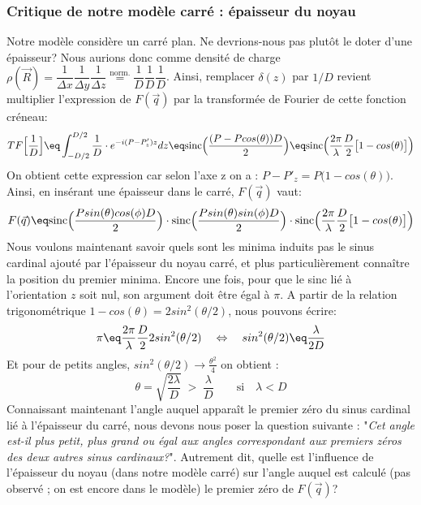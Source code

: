     \subsubsection{Critique de notre modèle carré : épaisseur du noyau}


Notre modèle considère un carré plan. Ne devrions-nous pas plutôt le doter d'une épaisseur? Nous aurions donc comme densité de charge $\rho(\vec{R}) = \dfrac{1}{\Delta x}\dfrac{1}{\Delta y} \dfrac{1}{\Delta z} \overset{\text{norm.}}= \dfrac{1}{D}\dfrac{1}{D} \dfrac{1}{D}$. Ainsi, remplacer $\delta(z)$ par $1/D$ revient multiplier l'expression de $F(\vec{q})$ par la transformée de Fourier de cette fonction créneau:
\begin{equation*}
    TF\Big[ \dfrac{1}{D} \Big] \eq
    \int_{-D/2}^{D/2}\dfrac{1}{D} \cdot e^{-i(P-P'_z)z} dz
    \eq
    \text{sinc}\Big(\dfrac{(P - P cos(\theta))D}{2}\Big)
    \eq
    \text{sinc}\Big(\dfrac{2\pi}{\lambda} \dfrac{D}{2} 
    \big[ 1-cos(\theta) \big]\Big)
\end{equation*}
On obtient cette expression car selon l'axe z on a : $P - P'_z = P\Big(1 - cos(\theta) \Big)$. Ainsi, en insérant une épaisseur dans le carré, $F(\vec{q})$ vaut:
\begin{equation*}
    F(\vec{q}) \eq 
    \text{sinc}\Big(\dfrac{P sin(\theta)cos(\phi)D}{2}\Big) \cdot
    \text{sinc}\Big(\dfrac{P sin(\theta)sin(\phi)D}{2}\Big) \cdot
    \text{sinc}\Big(\dfrac{2\pi}{\lambda} \dfrac{D}{2} 
    \big[ 1-cos(\theta) \big]\Big)
\end{equation*}
Nous voulons maintenant savoir quels sont les minima induits pas le sinus cardinal ajouté par l'épaisseur du noyau carré, et plus particulièrement connaître la position du premier minima. Encore une fois, pour que le sinc lié à l'orientation $z$ soit nul, son argument doit être égal à $\pi$.
A partir de la relation trigonométrique $1-cos(\theta) = 2sin^2(\theta /2)$, nous pouvons écrire:
\begin{equation*}
    \pi \eq
    \dfrac{2\pi}{\lambda} \dfrac{D}{2}
    2 sin^2(\theta /2)
    \quad \Leftrightarrow \quad
    sin^2(\theta /2) \eq \frac{\lambda}{2D}
\end{equation*}
Et pour de petits angles, $sin^2(\theta /2) \rightarrow \frac{\theta^2}{4}$ on obtient :
\begin{equation*}
    \theta = \sqrt{\frac{2\lambda}{D}} \; > \; \frac{\lambda}{D}
    \qquad \text{si} \quad \lambda < D
\end{equation*}
Connaissant maintenant l'angle auquel apparaît le premier zéro du sinus cardinal lié à l'épaisseur du carré, nous devons nous poser la question suivante : "\textit{Cet angle est-il plus petit, plus grand ou égal aux angles correspondant aux premiers zéros des deux autres sinus cardinaux?}". Autrement dit, quelle est l'influence de l'épaisseur du noyau (dans notre modèle carré) sur l'angle auquel est calculé (pas observé ; on est encore dans le modèle) le premier zéro de $F(\vec{q})$?\\

